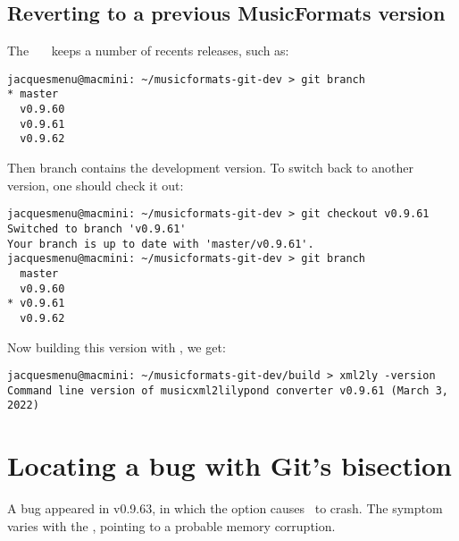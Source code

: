 \section{Reverting to a previous MusicFormats version}

The \github\ \mf\ \repo\ keeps a number of recents releases, such as:
\begin{lstlisting}[language=Terminal]
jacquesmenu@macmini: ~/musicformats-git-dev > git branch
* master
  v0.9.60
  v0.9.61
  v0.9.62
\end{lstlisting}

Then  branch contains the development version. To switch back to another version, one should check it out:
\begin{lstlisting}[language=Terminal]
jacquesmenu@macmini: ~/musicformats-git-dev > git checkout v0.9.61
Switched to branch 'v0.9.61'
Your branch is up to date with 'master/v0.9.61'.
jacquesmenu@macmini: ~/musicformats-git-dev > git branch
  master
  v0.9.60
* v0.9.61
  v0.9.62
\end{lstlisting}

Now building this version with , we get:
\begin{lstlisting}[language=Terminal]
jacquesmenu@macmini: ~/musicformats-git-dev/build > xml2ly -version
Command line version of musicxml2lilypond converter v0.9.61 (March 3, 2022)
\end{lstlisting}


\chapter{Locating a bug with Git's bisection}

A bug appeared in v0.9.63, in which the  option causes \xmlToLy\ to crash.
The symptom varies with the \OS, pointing to a probable memory corruption.

